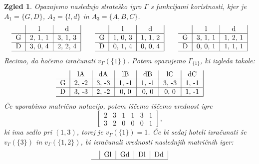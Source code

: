 \documentclass[10pt, a4paper]{article}
\newtheorem{zgled}[izr]{Zgled}
\begin{document}
\begin{zgled}
  Opazujemo naslednjo strateško igro $\Gamma$ s funkcijami koristnosti,
  kjer je $A_1 = \{G, D\}$, $A_2 = \{l, d\}$ in $A_3 = \{A, B, C\}$.
  $$  
  {\begin{tabular}{c|c|c|}
    & \textrm{l} & \textrm{d}\\
    \hline
    \textrm{G} & 2, 1, 1 & 3, 1, 3\\
    \hline
    \textrm{D} & 3, 0, 4 & 2, 2, 4\\
    \hline
  \end{tabular}}
  \qquad
  {\begin{tabular}{c|c|c|}
    & \textrm{l} & \textrm{d}\\
    \hline
    \textrm{G} & 1, 0, 3 & 1, 1, 2\\
    \hline
    \textrm{D} & 0, 1, 4 & 0, 0, 4\\
    \hline
\end{tabular}}
\qquad
  {\begin{tabular}{c|c|c|}
    & \textrm{l} & \textrm{d}\\
    \hline
    \textrm{G} & 3, 1, 1 & 1, 2, 1\\
    \hline
    \textrm{D} & 0, 0, 1 & 1, 1, 1\\
    \hline
  \end{tabular}}
$$
Recimo, da hočemo izračunati $v_{\Gamma} (\{1\})$.
Potem opazujemo $\Gamma_{\{1\}}$, ki izgleda takole:
$$  {\begin{tabular}{c|c|c|c|c|c|c|}
  & \textrm{lA} & \textrm{dA} & \textrm{lB} & \textrm{dB} & \textrm{lC} & \textrm{dC}\\
  \hline
  \textrm{G} & 2, -2 & 3, -3 & 1, -1 & 1, -1 & 3, -3 & 1, -1\\
  \hline
  \textrm{D} & 3, -3 & 2, -2 & 0, 0 & 0, 0 & 0, 0 & 1, -1\\
  \hline
\end{tabular}}$$
Če uporabimo matrično notacijo, potem iščemo iščemo vrednost igre 
$$\begin{bmatrix}
  2 & 3 & 1 & 1 & 3 & 1\\
  3 & 2 & 0 & 0 & 0 & 1
\end{bmatrix},$$
ki ima sedlo pri $(1, 3)$, torej je $v_{\Gamma} (\{1\}) = 1$.
Če bi sedaj hoteli izračunati še $v_\Gamma (\{3\})$ in $v_\Gamma (\{1, 2\})$,
bi izračunali vrednosti naslednjih matričnih iger:
$${\begin{tabular}{c|c|c|c|c|}
  & \textrm{Gl} & \textrm{Gd} & \textrm{Dl} & \textrm{Dd}\\
  \hline

\end{tabular}}$$
\end{zgled}
\end{document}
